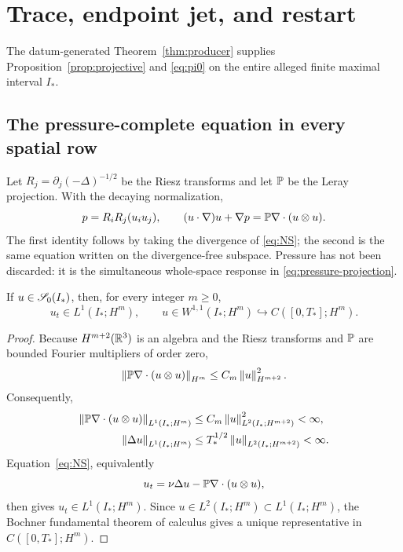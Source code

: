 \section{Trace, endpoint jet, and restart}
\label{sec:downstream}

The datum-generated Theorem~\ref{thm:producer} supplies
Proposition~\ref{prop:projective} and \eqref{eq:pi0} on the
entire alleged finite maximal interval \(I_*\).

\subsection{The pressure-complete equation in every spatial row}

Let \(R_j=\partial_j(-\Delta)^{-1/2}\) be the Riesz transforms and let
\(\mathbb P\) be the Leray projection. With the decaying normalization,
\begin{equation}
 p=R_iR_j(u_i u_j),
 \qquad
 (u\cdot\nabla)u+\nabla p
 =\mathbb P\nabla\cdot(u\otimes u).
 \label{eq:pressure-projection}
\end{equation}
The first identity follows by taking the divergence of \eqref{eq:NS}; the
second is the same equation written on the divergence-free subspace. Pressure
has not been discarded: it is the simultaneous whole-space response in
\eqref{eq:pressure-projection}.

\begin{lemma}
\label{lem:S0-endpoint}
If \(u\in\mathscr S_0(I_*)\), then, for every integer \(m\geq0\),
\[
 u_t\in L^1(I_*;H^m),
 \qquad
 u\in W^{1,1}(I_*;H^m)\hookrightarrow C([0,T_*];H^m).
\]
\end{lemma}

\begin{proof}
Because \(H^{m+2}(\mathbb R^3)\) is an algebra and the Riesz transforms and
\(\mathbb P\) are bounded Fourier multipliers of order zero,
\begin{equation}
 \left\lVert \mathbb P\nabla\cdot(u\otimes u)\right\rVert_{H^m}
 \leq C_m\left\lVert u\right\rVert_{H^{m+2}}^2.
 \label{eq:nonlinear-Hm}
\end{equation}
Consequently,
\begin{align}
 \left\lVert \mathbb P\nabla\cdot(u\otimes u)\right\rVert_{L^1(I_*;H^m)}
 &\leq C_m\left\lVert u\right\rVert_{L^2(I_*;H^{m+2})}^2<\infty,
 \label{eq:nonlinear-L1}\\
 \left\lVert \Delta u\right\rVert_{L^1(I_*;H^m)}
 &\leq T_*^{1/2}\left\lVert u\right\rVert_{L^2(I_*;H^{m+2})}<\infty.
 \label{eq:viscous-L1}
\end{align}
Equation~\eqref{eq:NS}, equivalently
\[
 u_t=\nu\Delta u-\mathbb P\nabla\cdot(u\otimes u),
\]
then gives \(u_t\in L^1(I_*;H^m)\). Since
\(u\in L^2(I_*;H^m)\subset L^1(I_*;H^m)\), the Bochner fundamental theorem
of calculus gives a unique representative in \(C([0,T_*];H^m)\).
\end{proof}

